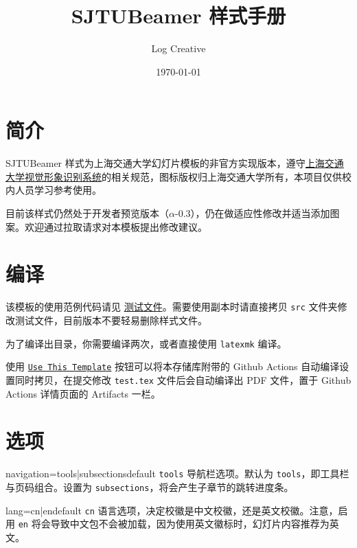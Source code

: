 \documentclass[a4paper,12pt]{article}
\begin{document}
\begin{CJK}{UTF8}{song}
\title{\textsf{SJTUBeamer} 样式手册}
\author{Log Creative}
\date{\today}
\maketitle

\tableofcontents    %

\section{简介}

\textsf{SJTUBeamer} 样式为上海交通大学幻灯片模板的非官方实现版本，遵守\href{http://vi.sjtu.edu.cn/}{上海交通大学视觉形象识别系统}的相关规范，图标版权归上海交通大学所有，本项目仅供校内人员学习参考使用。

目前该样式仍然处于开发者预览版本（$\alpha$-0.3），仍在做适应性修改并适当添加图案。欢迎通过拉取请求对本模板提出修改建议。

\section{编译}

该模板的使用范例代码请见 \href{https://github.com/LogCreative/SJTUBeamer/blob/main/src/test.tex}{测试文件}。需要使用副本时请直接拷贝 \verb"src" 文件夹修改测试文件，目前版本不要轻易删除样式文件。

为了编译出目录，你需要编译两次，或者直接使用 \verb"latexmk" 编译。

使用 \href{https://github.com/LogCreative/SJTUBeamer/generate}{\texttt{Use This Template}} 按钮可以将本存储库附带的 Github Actions 自动编译设置同时拷贝，在提交修改 \verb"test.tex" 文件后会自动编译出 PDF 文件，置于 Github Actions 详情页面的 Artifacts 一栏。

\section{选项}

\begin{docKey*}[SJTUBeamer]{navigation}{=tools|subsections}{default \texttt{tools}}
    导航栏选项。默认为 \verb"tools"，即工具栏与页码组合。设置为 \verb"subsections"，将会产生子章节的跳转进度条。
\end{docKey*}

\begin{docKey*}[SJTUBeamer]{lang}{=cn|en}{default \texttt{cn}}
    语言选项，决定校徽是中文校徽，还是英文校徽。注意，启用 \texttt{en} 将会导致中文包不会被加载，因为使用英文徽标时，幻灯片内容推荐为英文。
\end{docKey*}


\end{CJK}
\end{document}
